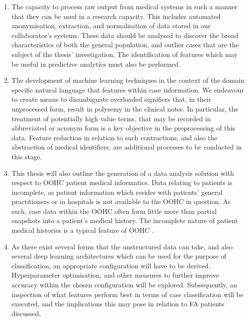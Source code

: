 \begin{enumerate}
  \item The capacity to process raw output from medical systems in such a manner that they can be used in a research capacity. This includes automated anonymisation, extraction, and normalisation of data stored in our collaborator's systems. These data should be analysed to discover the broad characteristics of both the general population, and outlier cases that are the subject of the thesis' investigation. The identification of features which may be useful in predictive analytics must also be performed.

  \item The development of machine learning techniques in the context of the domain specific natural language that features within case information. We endeavour to create means to disambiguate overloaded signifiers that, in their unprocessed form,  result in polysemy in the clinical notes. In particular, the treatment of potentially high value terms, that may be recorded in abbreviated or acronym form is a key objective in the preprocessing of this data. Feature reduction in relation to such contractions, and also the abstraction of medical identifiers, are additional processes to be conducted in this stage.



  \item This thesis will also outline the generation of a data analysis solution with respect to OOHC patient medical informatics. Data relating to patients is incomplete, as patient information which resides with patients' general practitioners or in hospitals is not available to the OOHC in question. As such, case data within the OOHC often form little more than partial snapshots into a patient's medical history. The incomplete nature of patient medical histories is a typical feature of OOHC \cite{yadav2018mining,moskow2015identifying,petersen2019health}. 

  \item As there exist several forms that the unstructured data can take, and also several deep learning architectures which can be used for the purpose of classification, an appropriate configuration will have to be derived.  Hyperparameter optimisation, and other measures to further improve accuracy within the chosen configuration will be explored. Subsequently, an inspection of what features perform best in terms of case classification will be executed, and the implications this may pose in relation to FA patients discussed.
\end{enumerate}


